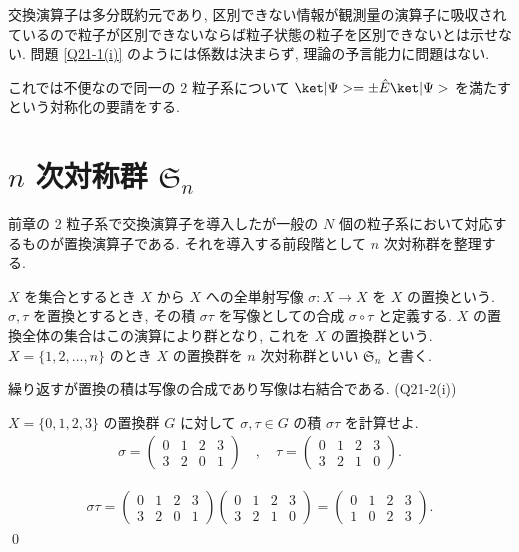 \documentclass[uplatex,dvipdfmx,a4paper,11pt]{jlreq}
\makeatletter
\renewcommand{\SS}{\mathfrak{S}}
\numberwithin{equation}{section}
\theoremstyle{definition}
\renewenvironment{proof}[1][\proofname]{\par
  \normalfont
  \topsep6\p@\@plus6\p@ \trivlist
  \item[\hskip\labelsep{\bfseries #1}\@addpunct{\bfseries}]\ignorespaces\quad\par
}{%
  \qed\endtrivlist\@endpefalse
}
\renewcommand\proofname{証明}
\makeatother
\begin{document}
\begin{problem}[Q21-1(xi)]
交換演算子は多分既約元であり, 区別できない情報が観測量の演算子に吸収されているので粒子が区別できないならば粒子状態の粒子を区別できないとは示せない. 問題 \ref{Q21-1(i)} のようには係数は決まらず, 理論の予言能力に問題はない.
\end{problem}

これでは不便なので同一の 2 粒子系について $\ket|\Psi> = \pm\hat{E}\ket|\Psi>$ を満たすという対称化の要請をする.

\section{$n$ 次対称群 $\SS_n$}
前章の 2 粒子系で交換演算子を導入したが一般の $N$ 個の粒子系において対応するものが置換演算子である. それを導入する前段階として $n$ 次対称群を整理する.
\begin{definition}[$n$ 次対称群]
  $X$ を集合とするとき $X$ から $X$ への全単射写像 $\sigma: X\to X$ を $X$ の置換という.
  $\sigma,\tau$ を置換とするとき, その積 $\sigma\tau$ を写像としての合成 $\sigma\circ\tau$ と定義する. $X$ の置換全体の集合はこの演算により群となり, これを $X$ の置換群という.
  $X = \{1,2,\ldots,n\}$ のとき $X$ の置換群を $n$ 次対称群といい $\SS_n$ と書く.
\end{definition}
繰り返すが置換の積は写像の合成であり写像は右結合である. (Q21-2(i))
\begin{problem}[Q21-2(ii)]
$X = \{0, 1, 2, 3\}$ の置換群 $G$ に対して $\sigma,\tau\in G$ の積 $\sigma\tau$ を計算せよ.
\begin{align}
  \sigma = \begin{pmatrix}
             0 & 1 & 2 & 3 \\
             3 & 2 & 0 & 1
           \end{pmatrix} \quad , \quad
  \tau = \begin{pmatrix}
           0 & 1 & 2 & 3 \\
           3 & 2 & 1 & 0
         \end{pmatrix}.
\end{align}
\end{problem}
\begin{proof}
  \begin{align}
    \sigma\tau =
    \begin{pmatrix}
      0 & 1 & 2 & 3 \\
      3 & 2 & 0 & 1
    \end{pmatrix}
    \begin{pmatrix}
      0 & 1 & 2 & 3 \\
      3 & 2 & 1 & 0
    \end{pmatrix}
    =
    \begin{pmatrix}
      0 & 1 & 2 & 3 \\
      1 & 0 & 2 & 3
    \end{pmatrix}.
  \end{align}
\end{proof}
\end{document}
